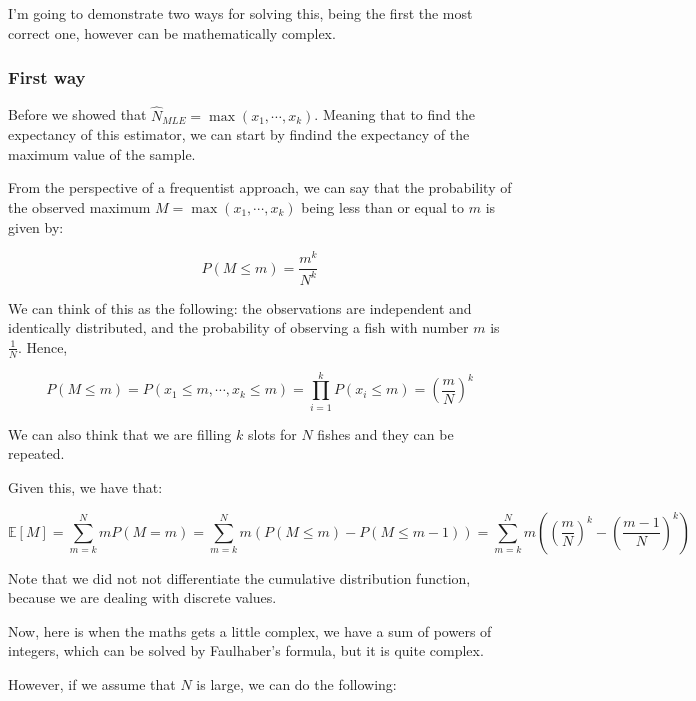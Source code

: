 \documentclass[12pt,a4paper,oneside]{paper}
\begin{document}
I'm going to demonstrate two ways for solving this, being the first the most correct one, however can be mathematically complex. 

\subsubsection*{First way}

Before we showed that $\hat{N}_{MLE} = \max(x_1, \cdots, x_k)$. Meaning that to find the expectancy of this estimator,
we can start by findind the expectancy of the maximum value of the sample.

From the perspective of a frequentist approach, we can say that the probability of the observed maximum $M = \max(x_1, \cdots, x_k)$
being less than or equal to $m$ is given by:

\[
P(M \leq m) = \frac{m^k}{N^k}
\]

We can think of this as the following: the observations are independent and identically distributed, and the probability of observing a fish with number $m$ is $\frac{1}{N}$.
Hence, 

\[
P(M \leq m) = P(x_1 \leq m, \cdots, x_k \leq m) = \prod_{i=1}^{k} P(x_i \leq m) = \left( \frac{m}{N} \right)^k
\]

We can also think that we are filling $k$ slots for $N$ fishes and they can be repeated. 

Given this, we have that:

\[
\mathbb{E}[M] = \sum_{m = k}^{N} m P(M = m) = \sum_{m = k}^{N} m \left(P(M \leq m) - P(M \leq m - 1) \right)= \sum_{m = k}^{N} m \left( \left( \frac{m}{N} \right)^k - \left( \frac{m - 1}{N} \right)^k \right)
\]

Note that we did not not differentiate the cumulative distribution function, because we are dealing with discrete values.

Now, here is when the maths gets a little complex, we have a sum of powers of integers, which can be solved by Faulhaber's formula,
but it is quite complex.

However, if we assume that $N$ is large, we can do the following: 
\end{document}
